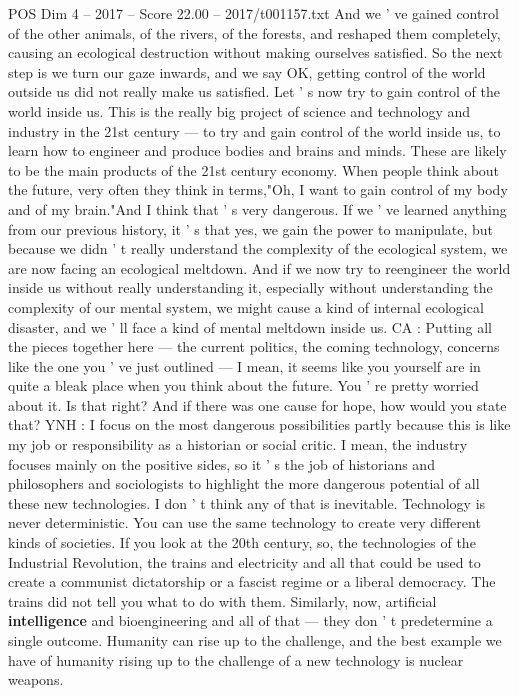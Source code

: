 \begin{textsample}{POS Dim 4 – 2017 – Score 22.00 – 2017/t001157.txt}
And we ' ve gained control of the other animals, of the rivers, of the forests, and reshaped them completely, causing an ecological destruction without making ourselves satisfied.
So the next step is we turn our gaze inwards, and we say OK, getting control of the world outside us did not really make us satisfied.
Let ' s now try to gain control of the world inside us.
This is the really big project of science and technology and industry in the 21st century — to try and gain control of the world inside us, to learn how to engineer and produce bodies and brains and minds.
These are likely to be the main products of the 21st century economy.
When people think about the future, very often they think in terms,"Oh, I want to gain control of my body and of my brain."And I think that ' s very dangerous.
If we ' ve learned anything from our previous history, it ' s that yes, we gain the power to manipulate, but because we didn ' t really understand the complexity of the ecological system, we are now facing an ecological meltdown.
And if we now try to reengineer the world inside us without really understanding it, especially without understanding the complexity of our mental system, we might cause a kind of internal ecological disaster, and we ' ll face a kind of mental meltdown inside us.
CA : Putting all the pieces together here — the current politics, the coming technology, concerns like the one you ' ve just outlined — I mean, it seems like you yourself are in quite a bleak place when you think about the future.
You ' re pretty worried about it.
Is that right?
And if there was one cause for hope, how would you state that?
YNH : I focus on the most dangerous possibilities partly because this is like my job or responsibility as a historian or social critic.
I mean, the industry focuses mainly on the positive sides, so it ' s the job of historians and philosophers and sociologists to highlight the more dangerous potential of all these new technologies.
I don ' t think any of that is inevitable.
Technology is never deterministic.
You can use the same technology to create very different kinds of societies.
If you look at the 20th century, so, the technologies of the Industrial Revolution, the trains and electricity and all that could be used to create a communist dictatorship or a fascist regime or a liberal democracy.
The trains did not tell you what to do with them.
Similarly, now, artificial \textbf{intelligence} and bioengineering and all of that — they don ' t predetermine a single outcome.
Humanity can rise up to the challenge, and the best example we have of humanity rising up to the challenge of a new technology is nuclear weapons.

\end{textsample}
